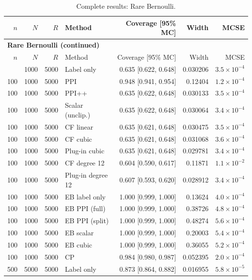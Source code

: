 {\setlength{\tabcolsep}{3pt}\begin{longtable}{rrrlrrr}
\caption{Complete results: Rare Bernoulli.}\\
\toprule $n$ & $N$ & $R$ & Method & Coverage [95\% MC] & Width & MCSE \\
\midrule\endfirsthead
\multicolumn{7}{l}{\textbf{Rare Bernoulli (continued)}}\\
\toprule $n$ & $N$ & $R$ & Method & Coverage [95\% MC] & Width & MCSE \\
\midrule\endhead
\bottomrule\endfoot
100 & 1000 & 5000 & Label only & 0.635 [0.622, 0.648] & 0.030206 & $3.5\times 10^{-4}$ \\
100 & 1000 & 5000 & PPI & 0.948 [0.941, 0.954] & 0.12404 & $1.2\times 10^{-4}$ \\
100 & 1000 & 5000 & PPI++ & 0.635 [0.622, 0.648] & 0.030133 & $3.5\times 10^{-4}$ \\
100 & 1000 & 5000 & Scalar (unclip.) & 0.635 [0.622, 0.648] & 0.030064 & $3.4\times 10^{-4}$ \\
100 & 1000 & 5000 & CF linear & 0.635 [0.621, 0.648] & 0.030475 & $3.5\times 10^{-4}$ \\
100 & 1000 & 5000 & CF cubic & 0.635 [0.621, 0.648] & 0.031068 & $3.6\times 10^{-4}$ \\
100 & 1000 & 5000 & Plug-in cubic & 0.635 [0.621, 0.648] & 0.029781 & $3.4\times 10^{-4}$ \\
100 & 1000 & 5000 & CF degree 12 & 0.604 [0.590, 0.617] & 0.11871 & $1.1\times 10^{-2}$ \\
100 & 1000 & 5000 & Plug-in degree 12 & 0.607 [0.593, 0.620] & 0.028912 & $3.4\times 10^{-4}$ \\
100 & 1000 & 5000 & EB label only & 1.000 [0.999, 1.000] & 0.13624 & $4.0\times 10^{-4}$ \\
100 & 1000 & 5000 & EB PPI (full) & 1.000 [0.999, 1.000] & 0.38726 & $4.8\times 10^{-4}$ \\
100 & 1000 & 5000 & EB PPI (split) & 1.000 [0.999, 1.000] & 0.48274 & $5.6\times 10^{-4}$ \\
100 & 1000 & 5000 & EB scalar & 1.000 [0.999, 1.000] & 0.20003 & $5.4\times 10^{-4}$ \\
100 & 1000 & 5000 & EB cubic & 1.000 [0.999, 1.000] & 0.36055 & $5.2\times 10^{-4}$ \\
100 & 1000 & 5000 & CP & 0.984 [0.980, 0.987] & 0.052395 & $2.0\times 10^{-4}$ \\
500 & 5000 & 5000 & Label only & 0.873 [0.864, 0.882] & 0.016955 & $5.8\times 10^{-5}$ \\

\end{longtable}}
